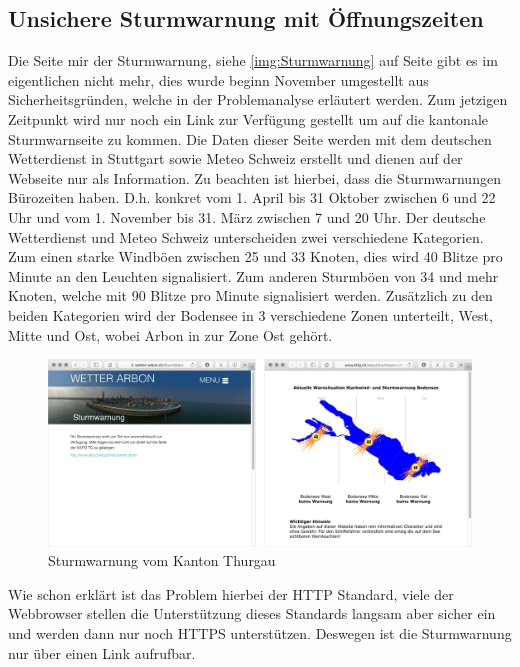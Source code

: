 \subsection{Unsichere Sturmwarnung mit Öffnungszeiten}

Die Seite mir der Sturmwarnung, siehe \ref{img:Sturmwarnung} auf Seite \pageref{img:Sturmwarnung} gibt es im eigentlichen nicht mehr, dies wurde beginn November umgestellt aus Sicherheitsgründen, welche in der Problemanalyse erläutert werden. Zum jetzigen Zeitpunkt wird nur noch ein Link zur Verfügung gestellt um auf die kantonale Sturmwarnseite zu kommen. Die Daten dieser Seite werden mit dem deutschen Wetterdienst in Stuttgart sowie Meteo Schweiz erstellt und dienen auf der Webseite nur als Information. Zu beachten ist hierbei, dass die Sturmwarnungen Bürozeiten haben. D.h. konkret vom 1. April bis 31 Oktober zwischen 6 und 22 Uhr und vom 1. November bis 31. März zwischen 7 und 20 Uhr. Der deutsche Wetterdienst und Meteo Schweiz unterscheiden zwei verschiedene Kategorien. Zum einen starke Windböen zwischen 25 und 33 Knoten, dies wird 40 Blitze pro Minute an den Leuchten signalisiert. Zum anderen Sturmböen von 34 und mehr Knoten, welche mit 90 Blitze pro Minute signalisiert werden. Zusätzlich zu den beiden Kategorien wird der Bodensee in 3 verschiedene Zonen unterteilt, West, Mitte und Ost, wobei Arbon in zur Zone Ost gehört. 

\begin{figure}[h!]
	\centering
	\includegraphics[width=1\linewidth]{img/sturm}
	\caption{Sturmwarnung vom Kanton Thurgau}
	\label{img:sturm}
\end{figure}

Wie schon erklärt ist das Problem hierbei der HTTP Standard, viele der Webbrowser stellen die Unterstützung dieses Standards langsam aber sicher ein und werden dann nur noch HTTPS unterstützen\cite{Mozilla:DeprecatingNon-SecureHTTP}. Deswegen ist die Sturmwarnung nur über einen Link aufrufbar. 